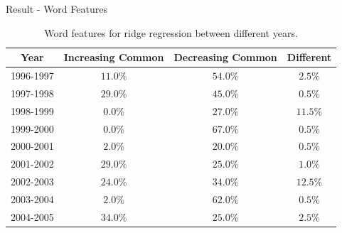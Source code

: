 \documentclass{beamer}
\begin{document}
\begin{frame}{Result - Word Features}

  \begin{table}[H]
    \centering
    \begin{tabular}{|c|c|c|c|}
      \hline
      Year      & Increasing Common & Decreasing Common & Different \\
      \hline
      1996-1997 & $11.0\%$          & $54.0\%$          & $2.5\%$   \\
      \hline
      1997-1998 & $29.0\%$          & $45.0\%$          & $0.5\%$   \\
      \hline
      1998-1999 & $0.0\%$           & $27.0\%$          & $11.5\%$  \\
      \hline
      1999-2000 & $0.0\%$           & $67.0\%$          & $0.5\%$   \\
      \hline
      2000-2001 & $2.0\%$           & $20.0\%$          & $0.5\%$   \\
      \hline
      2001-2002 & $29.0\%$          & $25.0\%$          & $1.0\%$   \\
      \hline
      2002-2003 & $24.0\%$          & $34.0\%$          & $12.5\%$  \\
      \hline
      2003-2004 & $2.0\%$           & $62.0\%$          & $0.5\%$   \\
      \hline
      2004-2005 & $34.0\%$          & $25.0\%$          & $2.5\%$   \\
      \hline
    \end{tabular}
    \caption{Word features for ridge regression between different years.}
  \end{table}

\end{frame}
\end{document}
